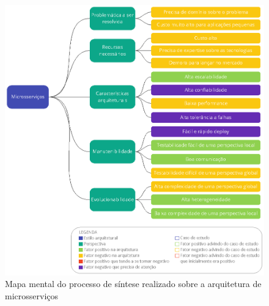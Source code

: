 \begin{figure}[h]
  \centering
  \includegraphics[keepaspectratio=true,scale=1]{figuras/sintese-microsservicos.eps}
  \caption{Mapa mental do processo de síntese realizado sobre a arquitetura de microsserviços\label{fig:SinteseMicro}}
\end{figure}
